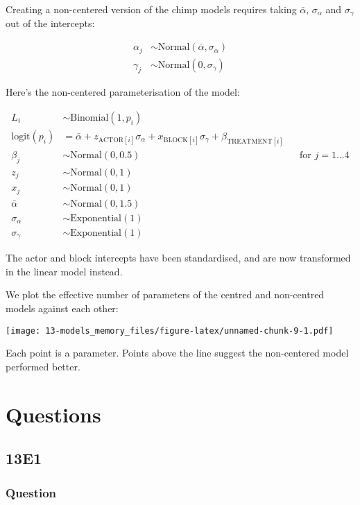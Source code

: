 \documentclass[
]{book}
\begin{document}
Creating a non-centered version of the chimp models requires taking \(\bar{\alpha}\), \(\sigma_\alpha\) and \(\sigma_\gamma\) out of the intercepts:

\[
\begin{aligned}
\alpha_j &\sim \text{Normal}(\bar{\alpha},\sigma_\alpha)\\
\gamma_j &\sim \text{Normal}(0,\sigma_\gamma)
\end{aligned}
\]

Here's the non-centered parameterisation of the model:

\[
\begin{aligned}
L_i &\sim \text{Binomial}(1,p_i) \\
\text{logit}(p_i) &= \bar{\alpha} +  z_{\text{ACTOR}[i]} \sigma_\alpha + x_{\text{BLOCK}[i]} \sigma_\gamma + \beta_{\text{TREATMENT}[i]} \\
\beta_j &\sim \text{Normal}(0,0.5) && \text{for } j = 1 \dots 4 \\
z_j &\sim \text{Normal}(0,1)  \\
x_j &\sim \text{Normal}(0,1) \\
\bar{\alpha} & \sim \text{Normal}(0,1.5) \\
\sigma_\alpha &\sim \text{Exponential}(1) \\
\sigma_\gamma &\sim \text{Exponential}(1)
\end{aligned}
\]

The actor and block intercepts have been standardised, and are now transformed in the linear model instead.

We plot the effective number of parameters of the centred and non-centred models against each other:

\texttt{[image: 13-models\_memory\_files/figure-latex/unnamed-chunk-9-1.pdf]}

Each point is a parameter. Points above the line suggest the non-centered model performed better.

\hypertarget{questions-12}{%
\section{Questions}\label{questions-12}}

\hypertarget{e1-10}{%
\subsection*{13E1}\label{e1-10}}

\hypertarget{question-99}{%
\subsubsection*{Question}\label{question-99}}
\end{document}
